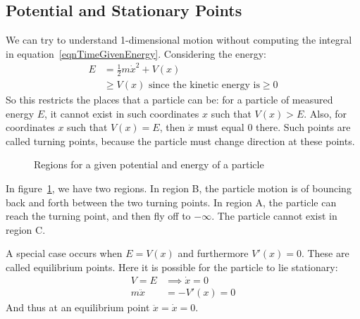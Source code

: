 \documentclass[../Main.tex]{subfiles}
\begin{document}
\subsection{Potential and Stationary Points}
We can try to understand 1-dimensional motion without computing the integral in equation~\ref{eqnTimeGivenEnergy}. Considering the energy:
\begin{align*}
    E &= \frac{1}{2} m \dot{x}^2 + V(x) \\
    &\geq V(x) \text{ since the kinetic energy is} \geq 0
\end{align*}
So this restricts the places that a particle can be: for a particle of measured energy $E$, it cannot exist in such coordinates $x$ such that $V(x) > E$. Also, for coordinates $x$ such that $V(x) = E$, then $\dot{x}$ must equal 0 there. Such points are called turning points, because the particle must change direction at these points. \par
\begin{figure}[ht]
    \centering
    \caption{Regions for a given potential and energy of a particle}
    \label{figPotentialPlot}
\end{figure}
In figure~\ref{figPotentialPlot}, we have two regions. In region B, the particle motion is of bouncing back and forth between the two turning points. In region A, the particle can reach the turning point, and then fly off to $-\infty$. The particle cannot exist in region C.\par
A special case occurs when $E = V(x)$ and furthermore $V'(x) = 0$. These are called equilibrium points. Here it is possible for the particle to lie stationary:
\begin{align*}
    V = E &\implies \dot{x} = 0 \\
    m\ddot{x} &= -V'(x) = 0
\end{align*}
And thus at an equilibrium point $\ddot{x} = \dot{x} = 0$.\par
\end{document}
